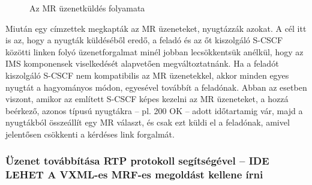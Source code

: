 \begin{figure}[htbp]
\center
{}
\caption{Az MR üzenetküldés folyamata}
\label{fig:mrflow}
\end{figure}

Miután egy címzettek megkapták az MR üzeneteket, nyugtázzák azokat. A cél itt is az, hogy a nyugták küldéséből eredő, a feladó és az őt kiszolgáló S-CSCF közötti linken folyó üzenetforgalmat minél jobban lecsökkentsük anélkül, hogy az IMS komponensek viselkedését alapvetően megváltoztatnánk. Ha a feladót kiszolgáló S-CSCF nem kompatibilis az MR üzenetekkel, akkor minden egyes nyugtát a hagyományos módon, egyesével továbbít a feladónak. Abban az esetben viszont, amikor az említett S-CSCF képes kezelni az MR üzeneteket, a hozzá beérkező, azonos típusú nyugtákra -- pl. 200 OK -- adott időtartamig vár, majd a nyugtákból összeállít egy MR választ, és csak ezt küldi el a feladónak, amivel jelentősen csökkenti a kérdéses link forgalmát.

\subsubsection{Üzenet továbbítása RTP protokoll segítségével -- {\color{red}IDE LEHET A VXML-es MRF-es megoldást kellene írni}}

